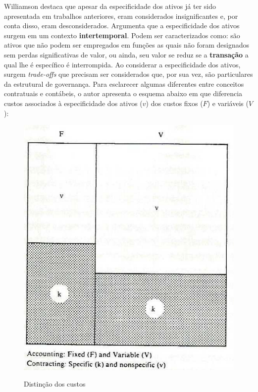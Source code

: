 Williamson destaca que apesar da especificidade dos ativos já ter sido apresentada em trabalhos anteriores, eram considerados insignificantes e, por conta disso, eram desconsiderados. Argumenta que a especificidade dos ativos surgem em um contexto \textbf{intertemporal}. Podem ser caracterizados como: são ativos que não podem ser empregados em funções as quais não foram designados sem perdas significativas de valor, ou ainda, seu valor se reduz se a \textbf{transação} a qual lhe é específico é interrompida. Ao considerar a especificidade dos ativos, surgem \textit{trade-offs} que precisam ser considerados que, por sua vez, são particulares da estrutural de governança. Para esclarecer algumas diferentes entre conceitos contratuais e contábeis, o autor apresenta o esquema abaixo em que diferencia custos associados à especificidade dos ativos ($v$) dos custos fixos ($F$) e variáveis ($V$):

\begin{figure}[H]
	\centering
	\caption{Distinção dos custos}
	\includegraphics[width=0.7\linewidth]{screenshot005}
	\label{fig:screenshot005}
\end{figure}

